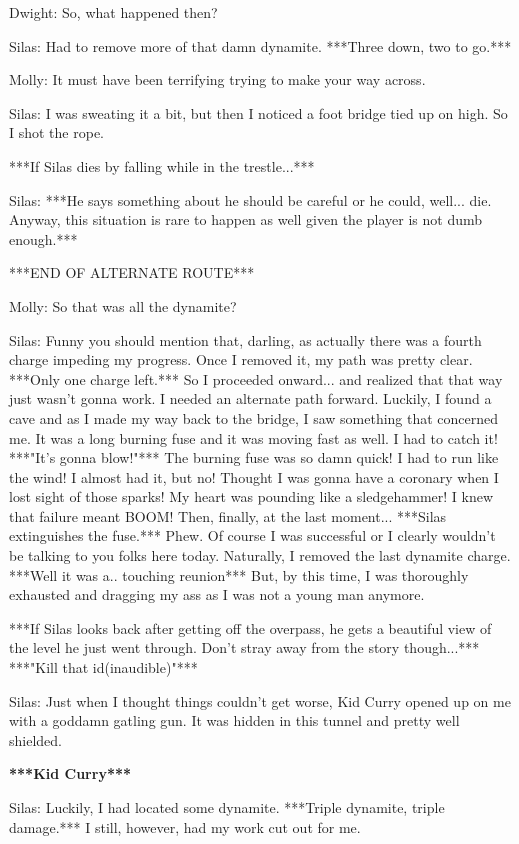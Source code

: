 \documentclass{article}
\begin{document}
Dwight: So, what happened then?

Silas: Had to remove more of that damn dynamite. ***Three down, two to go.***

Molly: It must have been terrifying trying to make your way across.

Silas: I was sweating it a bit, but then I noticed a foot bridge tied up on high. So I shot the rope.

***If Silas dies by falling while in the trestle...***

Silas: ***He says something about he should be careful or he could, well... die. Anyway, this situation is rare to happen as well given the player is not dumb enough.***

***END OF ALTERNATE ROUTE***

Molly: So that was all the dynamite?

Silas: Funny you should mention that, darling, as actually there was a fourth charge impeding my progress. Once I removed it, my path was pretty clear. ***Only one charge left.*** So I proceeded onward... and realized that that way just wasn't gonna work. I needed an alternate path forward. Luckily, I found a cave and as I made my way back to the bridge, I saw something that concerned me. It was a long burning fuse and it was moving fast as well. I had to catch it! ***"It's gonna blow!"*** The burning fuse was so damn quick! I had to run like the wind! I almost had it, but no! Thought I was gonna have a coronary when I lost sight of those sparks! My heart was pounding like a sledgehammer! I knew that failure meant BOOM! Then, finally, at the last moment... ***Silas extinguishes the fuse.*** Phew. Of course I was successful or I clearly wouldn't be talking to you folks here today. Naturally, I removed the last dynamite charge. ***Well it was a.. touching reunion*** But, by this time, I was thoroughly exhausted and dragging my ass as I was not a young man anymore.

***If Silas looks back after getting off the overpass, he gets a beautiful view of the level he just went through. Don't stray away from the story though...*** ***"Kill that id(inaudible)"***

Silas: Just when I thought things couldn't get worse, Kid Curry opened up on me with a goddamn gatling gun. It was hidden in this tunnel and pretty well shielded.

\textbf{***Kid Curry***}

Silas: Luckily, I had located some dynamite. ***Triple dynamite, triple damage.*** I still, however, had my work cut out for me.
\end{document}
